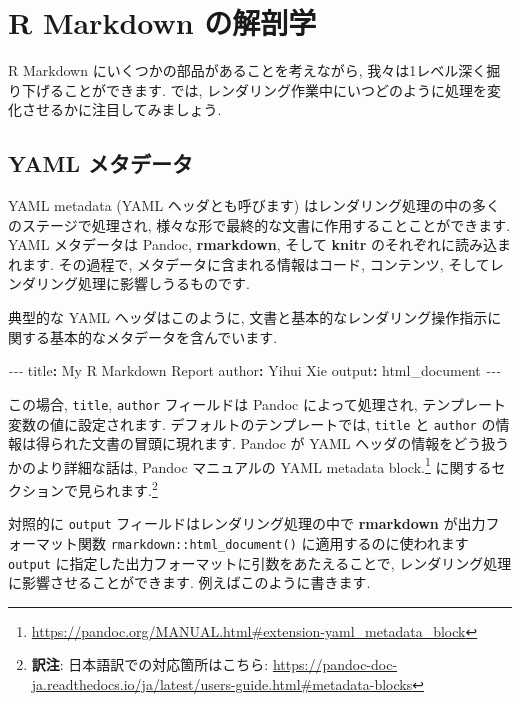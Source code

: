 \documentclass[
  11pt,
]{bxjsreport}
\newenvironment{Shaded}{\begin{snugshade}}{\end{snugshade}}
\newcommand{\AttributeTok}[1]{\textcolor[rgb]{0.77,0.63,0.00}{#1}}
\newcommand{\FunctionTok}[1]{\textcolor[rgb]{0.00,0.00,0.00}{#1}}
\newcommand{\KeywordTok}[1]{\textcolor[rgb]{0.13,0.29,0.53}{\textbf{#1}}}
\newcommand{\PreprocessorTok}[1]{\textcolor[rgb]{0.56,0.35,0.01}{\textit{#1}}}
\renewcommand{\href}[2]{#2\footnote{\url{#1}}}
\begin{document}
\hypertarget{rmarkdown-anatomy}{%
\section{R Markdown の解剖学}\label{rmarkdown-anatomy}}

R Markdown にいくつかの部品があることを考えながら, 我々は1レベル深く掘り下げることができます. では, レンダリング作業中にいつどのように処理を変化させるかに注目してみましょう.

\hypertarget{yaml-metadata}{%
\subsection{YAML メタデータ}\label{yaml-metadata}}

YAML metadata (YAML ヘッダとも呼びます) はレンダリング処理の中の多くのステージで処理され, 様々な形で最終的な文書に作用することことができます. YAML メタデータは Pandoc, \textbf{rmarkdown}, そして \textbf{knitr} のそれぞれに読み込まれます. その過程で, メタデータに含まれる情報はコード, コンテンツ, そしてレンダリング処理に影響しうるものです.

典型的な YAML ヘッダはこのように, 文書と基本的なレンダリング操作指示に関する基本的なメタデータを含んでいます.

\begin{Shaded}
\begin{Highlighting}[]
\PreprocessorTok{{-}{-}{-}}
\FunctionTok{title}\KeywordTok{:}\AttributeTok{ My R Markdown Report}
\FunctionTok{author}\KeywordTok{:}\AttributeTok{ Yihui Xie}
\FunctionTok{output}\KeywordTok{:}\AttributeTok{ html\_document}
\PreprocessorTok{{-}{-}{-}}
\end{Highlighting}
\end{Shaded}

この場合, \texttt{title}, \texttt{author} フィールドは Pandoc によって処理され, テンプレート変数の値に設定されます. デフォルトのテンプレートでは, \texttt{title} と \texttt{author} の情報は得られた文書の冒頭に現れます. Pandoc が YAML ヘッダの情報をどう扱うかのより詳細な話は, Pandoc マニュアルの \href{https://pandoc.org/MANUAL.html\#extension-yaml_metadata_block}{YAML metadata block.} に関するセクションで見られます.\footnote{\textbf{訳注}: 日本語訳での対応箇所はこちら: \url{https://pandoc-doc-ja.readthedocs.io/ja/latest/users-guide.html\#metadata-blocks}}

対照的に \texttt{output} フィールドはレンダリング処理の中で \textbf{rmarkdown} が出力フォーマット関数 \texttt{rmarkdown::html\_document()} に適用するのに使われます \texttt{output} に指定した出力フォーマットに引数をあたえることで, レンダリング処理に影響させることができます. 例えばこのように書きます.
\end{document}
